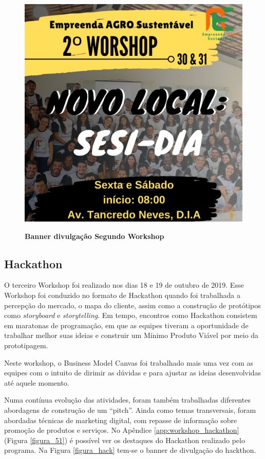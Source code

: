 \begin{figure}[H]
\centering
\caption{\textbf{Banner divulgação Segundo Workshop}}
\includegraphics[scale=0.23]{Imagens/2_workshop.jpg}
\label{divulgacao_segundo}
\end{figure}

\subsection{Hackathon}

O terceiro Workshop foi realizado nos dias 18 e 19 de outubro de 2019. Esse Workshop foi conduzido no formato de Hackathon quando foi trabalhada a percepção do mercado, o mapa do cliente, assim como a construção de protótipos como \textit{storyboard} e \textit{storytelling}. Em tempo, encontros como Hackathon consistem em maratonas de programação, em que as equipes tiveram a oportunidade de trabalhar melhor suas ideias e construir um Mínimo Produto Viável por meio da prototipagem.

Neste workshop, o Business Model Canvas foi trabalhado mais uma vez com as equipes com o intuito de dirimir as dúvidas e para ajustar as ideias desenvolvidas até aquele momento.

Numa contínua evolução das atividades, foram também trabalhadas diferentes abordagens de construção de um “pitch”. Ainda como temas transversais, foram abordadas técnicas de marketing digital, com repasse de informação sobre promoção de produtos e serviços. No Apêndice \ref{app:workshop_hackathon} (Figura \ref{figura_51}) é possível ver os destaques do Hackathon realizado pelo programa. Na Figura \ref{figura_hack} tem-se o banner de divulgação do hackthon.

